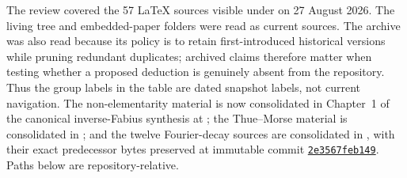 \documentclass[11pt,oneside]{article}
\theoremstyle{definition}
\theoremstyle{remark}
\begin{document}
The review covered the 57 LaTeX sources visible under
 on 27 August 2026.  The living tree and
embedded-paper folders were read as current sources.  The archive was also read
because its policy is to retain first-introduced historical versions while
pruning redundant duplicates; archived claims therefore matter when testing
whether a proposed deduction is genuinely absent from the repository.  Thus
the group labels in the table are dated snapshot labels, not current
navigation.  The non-elementarity material is now consolidated in Chapter~1
of the canonical inverse-Fabius synthesis at
;
the Thue--Morse material is consolidated in
; and the twelve
Fourier-decay sources are consolidated in
, with their
exact predecessor bytes preserved at immutable commit
\href{https://github.com/VladimirReshetnikov/ProveIt/tree/2e3567feb14947ee3ebcdab11adca64e746ad26f}{\texttt{2e3567feb149}}.
Paths below are repository-relative.
\end{document}
